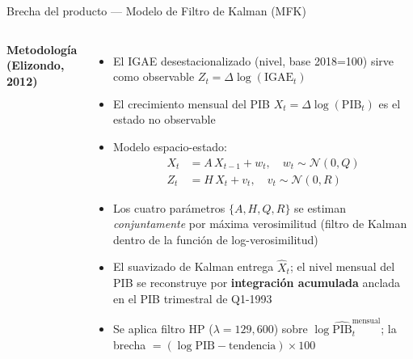 \documentclass[aspectratio=169, 10pt]{beamer}
\newcommand{\highlight}[1]{\textcolor{itamdark}{\textbf{#1}}}
\begin{document}
\begin{frame}{Brecha del producto — Modelo de Filtro de Kalman (MFK)}

  \begin{columns}[T]

    \textbf{\small Metodología (Elizondo, 2012)}
    \begin{itemize}\setlength\itemsep{4pt}
      \item[\highlight{1.}] El IGAE desestacionalizado (nivel, base 2018=100) sirve
            como \alert{observable} $Z_t = \Delta\log(\text{IGAE}_t)$
      \item[\highlight{2.}] El crecimiento mensual del PIB $X_t = \Delta\log(\text{PIB}_t)$
            es el \alert{estado no observable}
      \item[\highlight{3.}] Modelo espacio-estado:
        \begin{align*}
          X_t &= A\,X_{t-1} + w_t, \quad w_t \sim \mathcal{N}(0,Q) \\
          Z_t &= H\,X_t + v_t,\quad v_t \sim \mathcal{N}(0,R)
        \end{align*}
      \item[\highlight{4.}] Los cuatro parámetros $\{A,H,Q,R\}$ se estiman
            \textit{conjuntamente} por \alert{máxima verosimilitud}
            (filtro de Kalman dentro de la función de log-verosimilitud)
      \item[\highlight{5.}] El suavizado de Kalman entrega $\hat{X}_t$;
            el nivel mensual del PIB se reconstruye por
            \highlight{integración acumulada} anclada en el PIB trimestral de Q1-1993
      \item[\highlight{6.}] Se aplica filtro \alert{HP ($\lambda=129{,}600$)} sobre
            $\log\widehat{\text{PIB}}_t^{\text{mensual}}$;
            la brecha $= (\log\text{PIB} - \text{tendencia})\times 100$
    \end{itemize}


\end{columns}
\end{frame}
\end{document}
